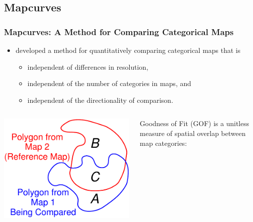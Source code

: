 \subsection{Mapcurves}
\begin{frame}
 \frametitle{Mapcurves: A Method for Comparing Categorical Maps}
 \vskip-0.10in
 \begin{itemize}\small
  \item \citet{Hargrove_JGS_20060701} developed a method for quantitatively comparing categorical maps that is
  \begin{itemize}
   \item independent of differences in resolution,
   \item independent of the number of categories in maps, and
   \item independent of the directionality of comparison.
  \end{itemize}
 \end{itemize}
 \begin{columns}[c]
  \begin{column}[c]{0.33\textwidth}
   \includegraphics[width=\textwidth]{figures/blobs.pdf}
  \end{column}
  \begin{column}[c]{0.66\textwidth}
   \begin{center}
    Goodness of Fit (GOF) is a unitless measure of spatial overlap between map categories:

\end{center}
\end{column}
\end{columns}
\end{frame}
